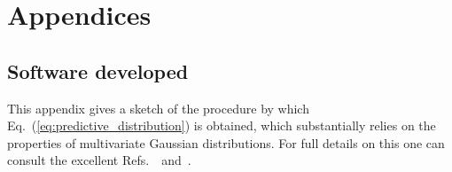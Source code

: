 
\setcounter{chapter}{-1}
\chapter{Appendices} \label{appendix}
\renewcommand{\thechapter}{A}


\section{Software developed}
\label{sec:Appendix_software}

This appendix gives a sketch of the procedure by which Eq.~(\ref{eq:predictive_distribution}) is obtained, which substantially relies on the properties of multivariate Gaussian distributions. For full details on this one can consult the excellent Refs.~\citep{--}~and~\citep{--}.
%


